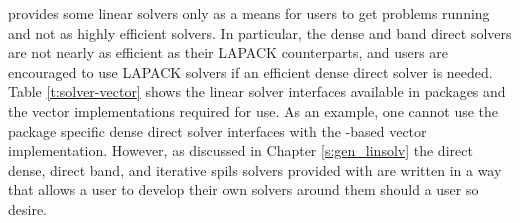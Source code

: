 {\sundials} provides some linear solvers only as a means for 
users to get problems running and not as highly efficient solvers.
In particular, the dense and band direct solvers are not nearly as efficient as
their LAPACK counterparts, and users are encouraged to use LAPACK solvers
if an efficient dense direct solver is needed.
Table \ref{t:solver-vector} shows the linear solver interfaces
available in {\sundials} packages and the vector implementations
required for use.  As an example, one cannot use the {\sundials} package
specific dense direct
solver interfaces  with the \mpi-based vector implementation.  However, 
as discussed in Chapter \ref{s:gen_linsolv} the direct dense, direct band, 
and iterative spils solvers provided with
{\sundials} are written in a way that allows a user to develop 
their own solvers around them should a user so desire.  

